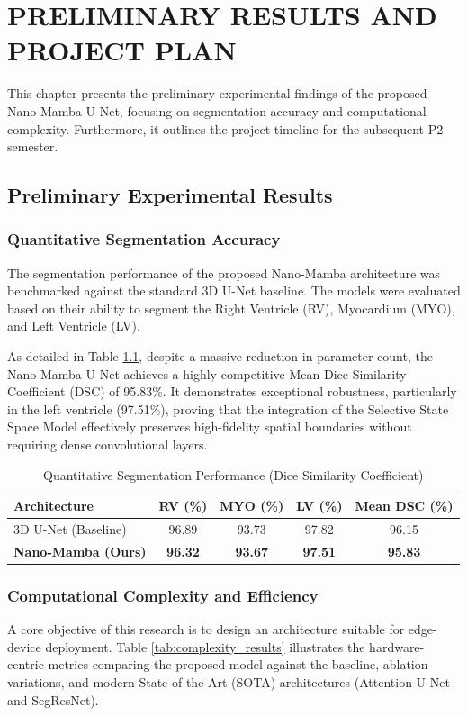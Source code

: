 \chapter{PRELIMINARY RESULTS AND PROJECT PLAN}
\label{chap:results}

This chapter presents the preliminary experimental findings of the proposed Nano-Mamba U-Net, focusing on segmentation accuracy and computational complexity. Furthermore, it outlines the project timeline for the subsequent P2 semester.

\section{Preliminary Experimental Results}

\subsection{Quantitative Segmentation Accuracy}
The segmentation performance of the proposed Nano-Mamba architecture was benchmarked against the standard 3D U-Net baseline. The models were evaluated based on their ability to segment the Right Ventricle (RV), Myocardium (MYO), and Left Ventricle (LV). 

As detailed in Table \ref{tab:dice_results}, despite a massive reduction in parameter count, the Nano-Mamba U-Net achieves a highly competitive Mean Dice Similarity Coefficient (DSC) of 95.83\%. It demonstrates exceptional robustness, particularly in the left ventricle (97.51\%), proving that the integration of the Selective State Space Model effectively preserves high-fidelity spatial boundaries without requiring dense convolutional layers.

\begin{table}[hbt!]
\caption{Quantitative Segmentation Performance (Dice Similarity Coefficient)}
\label{tab:dice_results}
\centering
\begin{tabular}{l c c c c}
\hline
\textbf{Architecture} & \textbf{RV (\%)} & \textbf{MYO (\%)} & \textbf{LV (\%)} & \textbf{Mean DSC (\%)}\\ 
\hline
3D U-Net (Baseline) & 96.89 & 93.73 & 97.82 & 96.15 \\
\textbf{Nano-Mamba (Ours)} & \textbf{96.32} & \textbf{93.67} & \textbf{97.51} & \textbf{95.83} \\
\hline
\end{tabular}
\end{table}

\subsection{Computational Complexity and Efficiency}
A core objective of this research is to design an architecture suitable for edge-device deployment. Table \ref{tab:complexity_results} illustrates the hardware-centric metrics comparing the proposed model against the baseline, ablation variations, and modern State-of-the-Art (SOTA) architectures (Attention U-Net and SegResNet).

